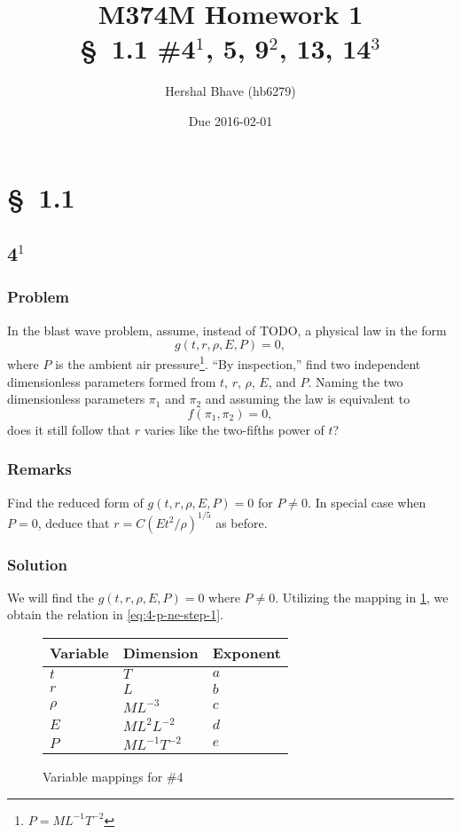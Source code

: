 \documentclass[12pt]{article}
\title{M374M Homework 1 \\
  \normalsize{\S~1.1 \#4$^1$, 5, 9$^2$, 13, 14$^3$}}
\author{Hershal Bhave (hb6279)}
\date{Due 2016-02-01}
\begin{document}
\maketitle

\section{\S~1.1}
\subsection{4$^1$}
  \subsubsection*{Problem}
  In the blast wave problem, assume, instead of {\color{red}TODO}, a physical law
  in the form
  \begin{equation}
    g(t,r,\rho,E,P)=0,
  \end{equation}
  where $P$ is the ambient air pressure\footnote{$P=M L^{-1} T^{-2}$}. ``By
  inspection,'' find two independent dimensionless parameters formed from $t$,
  $r$, $\rho$, $E$, and $P$. Naming the two dimensionless parameters $\pi_1$ and
  $\pi_2$ and assuming the law is equivalent to
  \begin{equation}
    f(\pi_1,\pi_2)=0,
  \end{equation}
  does it still follow that $r$ varies like the two-fifths power of $t$?

  \subsubsection*{Remarks}
  Find the reduced form of $g(t,r,\rho,E,P)=0$ for $P\ne0$. In special case when
  $P=0$, deduce that $r=C(Et^2/\rho)^{1/5}$ as before.

  \subsubsection*{Solution}
  We will find the  $g(t,r,\rho,E,P)=0$ where $P\ne0$. Utilizing the
  mapping in \cref{fig:4-var-mappings}, we obtain the relation in
  \cref{eq:4-p-ne-step-1}.

  \begin{figure}
    \centering
    \begin{tabularx}{0.5\textwidth}{XXX}
      Variable & Dimension & Exponent \\ \hline
      $t$ & $T$ & $a$ \\
      $r$ & $L$ & $b$ \\
      $\rho$ & $ML^{-3}$ & $c$ \\
      $E$ & $ML^{2}L^{-2}$ & $d$ \\
      $P$ & $ML^{-1}T^{-2}$ & $e$ \\
    \end{tabularx}
    \caption{Variable mappings for \#4}
    \label{fig:4-var-mappings}
  \end{figure}
\end{document}
